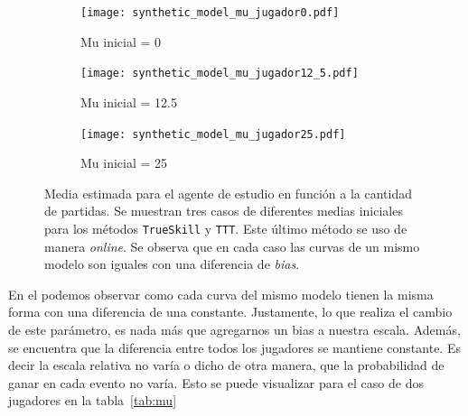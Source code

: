 \documentclass[11pt,twoside,spanish]{report} %
\begin{document}
\begin{figure}[H]
  \begin{subfigure}{0.33\textwidth}
    \texttt{[image: synthetic\_model\_mu\_jugador0.pdf]}
    \caption{Mu inicial = 0}
    \label{fig:Mu_jugador0}
  \end{subfigure}%
  \hfill
  \begin{subfigure}{0.33\textwidth}
    \texttt{[image: synthetic\_model\_mu\_jugador12\_5.pdf]}
    \caption{Mu inicial = 12.5}
    \label{fig:Mu_jugador12_5}
  \end{subfigure}%
  \hfill
  \begin{subfigure}{0.33\textwidth}
    \texttt{[image: synthetic\_model\_mu\_jugador25.pdf]}
    \caption{Mu inicial = 25}
    \label{fig:Mu_jugador25}
  \end{subfigure}

  \caption{Media estimada para el agente de estudio en funci\'on a la cantidad de partidas.	Se muestran tres casos de diferentes medias iniciales para los m\'etodos \texttt{TrueSkill} y \texttt{TTT}. Este \'ultimo m\'etodo se uso de manera \textit{online}. Se observa que en cada caso las curvas de un mismo modelo son iguales con una diferencia de \emph{bias}.}
  \label{fig:Mu_lc}
\end{figure}


En el podemos observar como cada curva del mismo modelo tienen la misma forma con una diferencia de una constante.
Justamente, lo que realiza el cambio de este par\'ametro, es nada m\'as que agregarnos un bias a nuestra escala.
Adem\'as, se encuentra que la diferencia entre todos los jugadores se mantiene constante.
Es decir la escala relativa no var\'ia o dicho de otra manera, que la probabilidad de ganar en cada evento no var\'ia.
Esto se puede visualizar para el caso de dos jugadores en la tabla~\ref{tab:mu}
\end{document}
